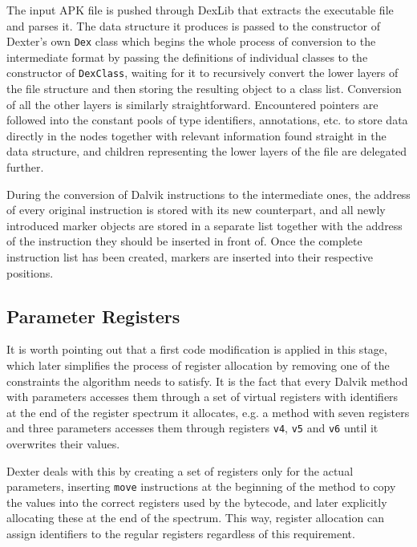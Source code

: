 \documentclass[12pt,twoside,notitlepage]{report}
\begin{document}
The input APK file is pushed through DexLib that extracts the executable file and parses it. The data structure it produces is passed to the constructor of Dexter's own \verb$Dex$ class which begins the whole process of conversion to the intermediate format by passing the definitions of individual classes to the constructor of \verb$DexClass$, waiting for it to recursively convert the lower layers of the file structure and then storing the resulting object to a class list. Conversion of all the other layers is similarly straightforward. Encountered pointers are followed into the constant pools of type identifiers, annotations, etc. to store data directly in the nodes together with relevant information found straight in the data structure, and children representing the lower layers of the file are delegated further. 

During the conversion of Dalvik instructions to the intermediate ones, the address of every original instruction is stored with its new counterpart, and all newly introduced marker objects are stored in a separate list together with the address of the instruction they should be inserted in front of. Once the complete instruction list has been created, markers are inserted into their respective positions.

\subsection{Parameter Registers}
\label{section:Code_ParamRegMapping}

It is worth pointing out that a first code modification is applied in this stage, which later simplifies the process of register allocation by removing one of the constraints the algorithm needs to satisfy. It is the fact that every Dalvik method with parameters accesses them through a set of virtual registers with identifiers at the end of the register spectrum it allocates, e.g. a method with seven registers and three parameters accesses them through registers \verb$v4$, \verb$v5$ and \verb$v6$ until it overwrites their values. 

Dexter deals with this by creating a set of registers only for the actual parameters, inserting \verb$move$ instructions at the beginning of the method to copy the values into the correct registers used by the bytecode, and later explicitly allocating these at the end of the spectrum. This way, register allocation can assign identifiers to the regular registers regardless of this requirement. 
\end{document}
